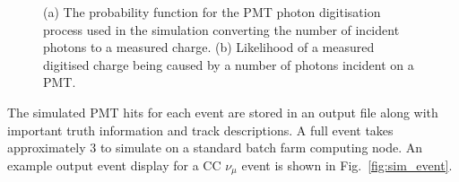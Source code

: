 \begin{figure} %
    \centering
    \quad
    \caption[Detector simulation PMT digitisation function]
    {(a) The probability function for the PMT photon digitisation process used in the simulation
        converting the number of incident photons to a measured charge. (b) Likelihood of a
        measured digitised charge being caused by a number of photons incident on a PMT.}
    \label{fig:digitisation}
\end{figure}

The simulated PMT hits for each event are stored in an output file along with important truth
information and track descriptions. A full event takes approximately \unit{3}{} to
simulate on a standard batch farm computing node. An example output event display for a CC
$\nu_{\mu}$ event is shown in Fig.~\ref{fig:sim_event}.

